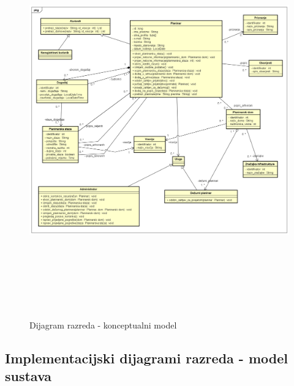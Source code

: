 			\begin{figure}[H]
				\includegraphics[scale=0.4, height=170mm, width=165mm]{dijagrami/domena-konceptualni.png} %
				\centering
				\caption{Dijagram razreda - konceptualni model}
				\label{fig:dijagrami_razreda3}
			\end{figure}
			
			\eject
			
			\subsection{Implementacijski dijagrami razreda - model sustava}
